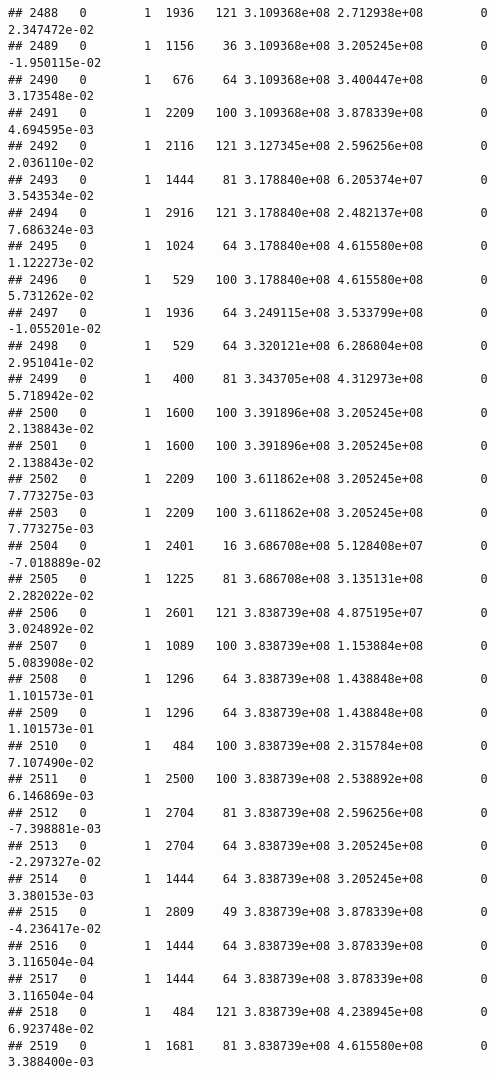 \documentclass[
]{article}
\begin{document}
\begin{enumerate}
\begin{verbatim}
## 2488   0        1  1936   121 3.109368e+08 2.712938e+08        0  2.347472e-02
## 2489   0        1  1156    36 3.109368e+08 3.205245e+08        0 -1.950115e-02
## 2490   0        1   676    64 3.109368e+08 3.400447e+08        0  3.173548e-02
## 2491   0        1  2209   100 3.109368e+08 3.878339e+08        0  4.694595e-03
## 2492   0        1  2116   121 3.127345e+08 2.596256e+08        0  2.036110e-02
## 2493   0        1  1444    81 3.178840e+08 6.205374e+07        0  3.543534e-02
## 2494   0        1  2916   121 3.178840e+08 2.482137e+08        0  7.686324e-03
## 2495   0        1  1024    64 3.178840e+08 4.615580e+08        0  1.122273e-02
## 2496   0        1   529   100 3.178840e+08 4.615580e+08        0  5.731262e-02
## 2497   0        1  1936    64 3.249115e+08 3.533799e+08        0 -1.055201e-02
## 2498   0        1   529    64 3.320121e+08 6.286804e+08        0  2.951041e-02
## 2499   0        1   400    81 3.343705e+08 4.312973e+08        0  5.718942e-02
## 2500   0        1  1600   100 3.391896e+08 3.205245e+08        0  2.138843e-02
## 2501   0        1  1600   100 3.391896e+08 3.205245e+08        0  2.138843e-02
## 2502   0        1  2209   100 3.611862e+08 3.205245e+08        0  7.773275e-03
## 2503   0        1  2209   100 3.611862e+08 3.205245e+08        0  7.773275e-03
## 2504   0        1  2401    16 3.686708e+08 5.128408e+07        0 -7.018889e-02
## 2505   0        1  1225    81 3.686708e+08 3.135131e+08        0  2.282022e-02
## 2506   0        1  2601   121 3.838739e+08 4.875195e+07        0  3.024892e-02
## 2507   0        1  1089   100 3.838739e+08 1.153884e+08        0  5.083908e-02
## 2508   0        1  1296    64 3.838739e+08 1.438848e+08        0  1.101573e-01
## 2509   0        1  1296    64 3.838739e+08 1.438848e+08        0  1.101573e-01
## 2510   0        1   484   100 3.838739e+08 2.315784e+08        0  7.107490e-02
## 2511   0        1  2500   100 3.838739e+08 2.538892e+08        0  6.146869e-03
## 2512   0        1  2704    81 3.838739e+08 2.596256e+08        0 -7.398881e-03
## 2513   0        1  2704    64 3.838739e+08 3.205245e+08        0 -2.297327e-02
## 2514   0        1  1444    64 3.838739e+08 3.205245e+08        0  3.380153e-03
## 2515   0        1  2809    49 3.838739e+08 3.878339e+08        0 -4.236417e-02
## 2516   0        1  1444    64 3.838739e+08 3.878339e+08        0  3.116504e-04
## 2517   0        1  1444    64 3.838739e+08 3.878339e+08        0  3.116504e-04
## 2518   0        1   484   121 3.838739e+08 4.238945e+08        0  6.923748e-02
## 2519   0        1  1681    81 3.838739e+08 4.615580e+08        0  3.388400e-03

\end{verbatim}
\end{enumerate}
\end{document}
